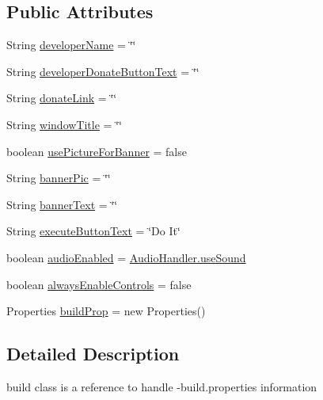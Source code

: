 \subsection*{Public Attributes}
\begin{DoxyCompactItemize}
\item 
String \hyperlink{class_c_a_s_u_a_l_1_1caspac_1_1_caspac_1_1_build_a6508efd0a89b6a97ce5ce6fd8f09e4ac}{developer\-Name} = \char`\"{}\char`\"{}
\item 
String \hyperlink{class_c_a_s_u_a_l_1_1caspac_1_1_caspac_1_1_build_adb3e52b35bc8d27e65047c0e6a0b55d4}{developer\-Donate\-Button\-Text} = \char`\"{}\char`\"{}
\item 
String \hyperlink{class_c_a_s_u_a_l_1_1caspac_1_1_caspac_1_1_build_a7e5da9bd2b41e2f4351fe5f7512502f7}{donate\-Link} = \char`\"{}\char`\"{}
\item 
String \hyperlink{class_c_a_s_u_a_l_1_1caspac_1_1_caspac_1_1_build_aa6995cfb0460660802746dcc9629ca0d}{window\-Title} = \char`\"{}\char`\"{}
\item 
boolean \hyperlink{class_c_a_s_u_a_l_1_1caspac_1_1_caspac_1_1_build_ae3b7a0025376a2cd9a7a57455637aa2a}{use\-Picture\-For\-Banner} = false
\item 
String \hyperlink{class_c_a_s_u_a_l_1_1caspac_1_1_caspac_1_1_build_a03022857b99f76633714c420ee0e6eb5}{banner\-Pic} = \char`\"{}\char`\"{}
\item 
String \hyperlink{class_c_a_s_u_a_l_1_1caspac_1_1_caspac_1_1_build_ad52dcd748136e46978261a093f5fbb9e}{banner\-Text} = \char`\"{}\char`\"{}
\item 
String \hyperlink{class_c_a_s_u_a_l_1_1caspac_1_1_caspac_1_1_build_a467591d36bbdbb5f6149a3faba1f34c2}{execute\-Button\-Text} = \char`\"{}Do It\char`\"{}
\item 
boolean \hyperlink{class_c_a_s_u_a_l_1_1caspac_1_1_caspac_1_1_build_adee517a9e5916fb44b09717997bf6ee4}{audio\-Enabled} = \hyperlink{class_c_a_s_u_a_l_1_1_audio_handler_ad7986b266c595310fa3ad7167d690594}{Audio\-Handler.\-use\-Sound}
\item 
boolean \hyperlink{class_c_a_s_u_a_l_1_1caspac_1_1_caspac_1_1_build_a64018302864b3074bde755ce8c1b52f0}{always\-Enable\-Controls} = false
\item 
Properties \hyperlink{class_c_a_s_u_a_l_1_1caspac_1_1_caspac_1_1_build_ae41e84cb3d34e8771bcbdfe5e9dbce54}{build\-Prop} = new Properties()
\end{DoxyCompactItemize}


\subsection{Detailed Description}
build class is a reference to handle -\/build.\-properties information 

